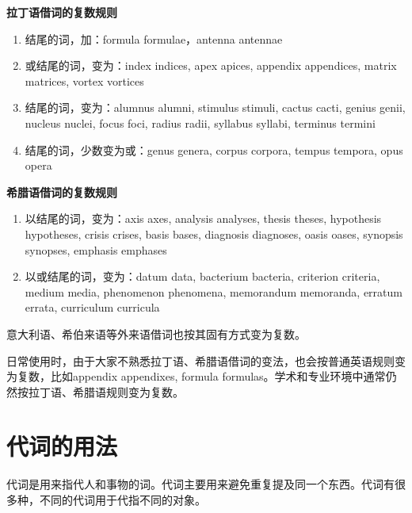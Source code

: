 \documentclass[10.5pt, a4paper]{ctexbook} %
\begin{document}
\textbf{拉丁语借词的复数规则}
\begin{enumerate}
    \item {}结尾的词，加：formula \warr formulae，antenna \warr antennae
    \item {}或结尾的词，变为：index \warr indices, apex \warr apices, appendix \warr appendices, matrix \warr matrices, vortex \warr vortices
    \item {}结尾的词，变为：alumnus \warr alumni, stimulus \warr stimuli, cactus \warr cacti, genius \warr genii, nucleus \warr nuclei, focus \warr foci, radius \warr radii, syllabus \warr syllabi, terminus \warr termini
    \item {}结尾的词，少数变为或：genus \warr genera, corpus \warr corpora, tempus \warr tempora, opus \warr opera
\end{enumerate}

\textbf{希腊语借词的复数规则}
\begin{enumerate}
    \item 以结尾的词，变为：axis \warr axes, analysis \warr analyses, thesis \warr theses, hypothesis \warr hypotheses, crisis \warr crises, basis \warr bases, diagnosis \warr diagnoses, oasis \warr oases, synopsis \warr synopses, emphasis \warr emphases
\item 以或结尾的词，变为：datum \warr data, bacterium \warr bacteria, criterion \warr criteria, medium \warr media, phenomenon \warr phenomena, memorandum \warr memoranda, erratum \warr errata, curriculum \warr curricula
\end{enumerate}

意大利语、希伯来语等外来语借词也按其固有方式变为复数。

日常使用时，由于大家不熟悉拉丁语、希腊语借词的变法，也会按普通英语规则变为复数，比如appendix \warr appendixes, formula \warr formulas。学术和专业环境中通常仍然按拉丁语、希腊语规则变为复数。

\section{代词的用法}

代词是用来指代人和事物的词。代词主要用来避免重复提及同一个东西。代词有很多种，不同的代词用于代指不同的对象。
\end{document}
